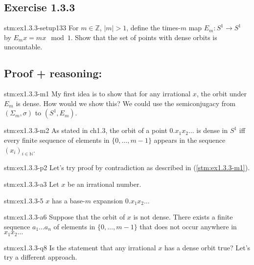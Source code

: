 \subsection*{Exercise 1.3.3}

\begin{exercise}{stm:ex1.3.3-setup133}
For $m \in \mathbb{Z}$, $|m| > 1$, define the times-$m$ map $E_m : S^1 \to S^1$ by $E_m x = mx \mod 1$. Show that the set of points with dense orbits is uncountable.
\end{exercise}

\subsection*{Proof {\color{blue} + reasoning}:}

\begin{explanation}{stm:ex1.3.3-m1}
My first idea is to show that for any irrational $x$, the orbit under $E_m$ is dense. How would we show this? We could use the semiconjugacy from $(\Sigma_m, \sigma)$ to $(S^1, E_m)$.
\end{explanation}

\begin{statement}{stm:ex1.3.3-m2}
As stated in ch1.3, the orbit of a point $0.x_1 x_2 \dots$ is dense in $S^1$ iff every finite sequence of elements in $\{0, \dots, m-1\}$ appears in the sequence $(x_i)_{i \in \mathbb{N}}$.
\end{statement}

\begin{explanation}{stm:ex1.3.3-p2}
Let's try proof by contradiction as described in (\ref{stm:ex1.3.3-m1}).
\end{explanation}

\begin{explanation}{stm:ex1.3.3-a3}
Let $x$ be an irrational number.
\end{explanation}

\begin{explanation}{stm:ex1.3.3-5}
$x$ has a base-$m$ expansion $0.x_1 x_2 \dots$
\end{explanation}

\begin{explanation}{stm:ex1.3.3-a6}
Suppose that the orbit of $x$ is not dense. There exists a finite sequence $a_1 \dots a_n$ of elements in $\{0, \dots, m-1\}$ that does not occur anywhere in $x_1 x_2 \dots$
\end{explanation}

\begin{explanation}{stm:ex1.3.3-q8}
Is the statement that any irrational $x$ has a dense orbit true? Let's try a different approach.
\end{explanation}

